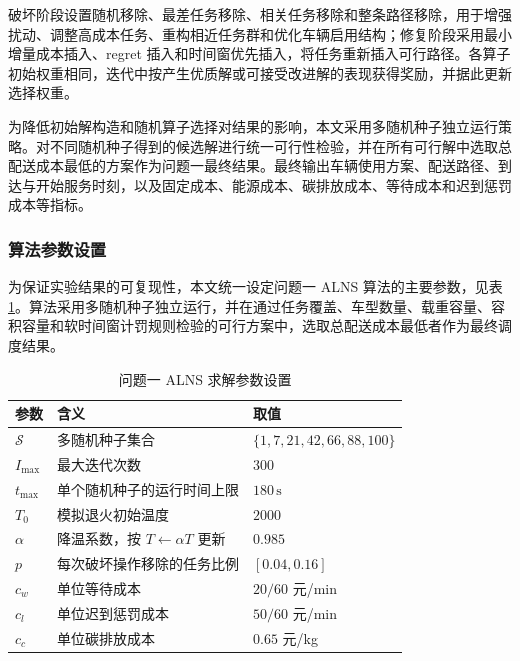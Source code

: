 \documentclass[withoutpreface,bwprint]{cumcmthesis} %
\begin{document}
\FloatBarrier

破坏阶段设置随机移除、最差任务移除、相关任务移除和整条路径移除，用于增强扰动、调整高成本任务、重构相近任务群和优化车辆启用结构；修复阶段采用最小增量成本插入、regret 插入和时间窗优先插入，将任务重新插入可行路径。各算子初始权重相同，迭代中按产生优质解或可接受改进解的表现获得奖励，并据此更新选择权重。

为降低初始解构造和随机算子选择对结果的影响，本文采用多随机种子独立运行策略。对不同随机种子得到的候选解进行统一可行性检验，并在所有可行解中选取总配送成本最低的方案作为问题一最终结果。最终输出车辆使用方案、配送路径、到达与开始服务时刻，以及固定成本、能源成本、碳排放成本、等待成本和迟到惩罚成本等指标。

\subsubsection{算法参数设置}

为保证实验结果的可复现性，本文统一设定问题一 ALNS 算法的主要参数，见表 \ref{tab:p1_alns_params}。算法采用多随机种子独立运行，并在通过任务覆盖、车型数量、载重容量、容积容量和软时间窗计罚规则检验的可行方案中，选取总配送成本最低者作为最终调度结果。

\begin{table}[H]
\centering
\caption{问题一 ALNS 求解参数设置}
\label{tab:p1_alns_params}
\renewcommand{\arraystretch}{1.16}
\setlength{\tabcolsep}{8pt}
\small
\begin{tabular}{
>{\centering\arraybackslash}p{}
>{\centering\arraybackslash}p{}
>{\centering\arraybackslash}p{}}
\toprule
\rowcolor{tablehead}
\textbf{参数} & \textbf{含义} & \textbf{取值} \\
\midrule
$\mathcal{S}$ & 多随机种子集合 & $\{1,7,21,42,66,88,100\}$ \\
\rowcolor{tablerow}
$I_{\max}$ & 最大迭代次数 & $300$ \\
$t_{\max}$ & 单个随机种子的运行时间上限 & $180\,\mathrm{s}$ \\
\rowcolor{tablerow}
$T_0$ & 模拟退火初始温度 & $2000$ \\
$\alpha$ & 降温系数，按 $T\leftarrow \alpha T$ 更新 & $0.985$ \\
\rowcolor{tablerow}
$p$ & 每次破坏操作移除的任务比例 & $[0.04,0.16]$ \\
$c_w$ & 单位等待成本 & $20/60$ 元/min \\
\rowcolor{tablerow}
$c_l$ & 单位迟到惩罚成本 & $50/60$ 元/min \\
$c_c$ & 单位碳排放成本 & $0.65$ 元/kg \\
\bottomrule
\end{tabular}
\end{table}
\end{document}
